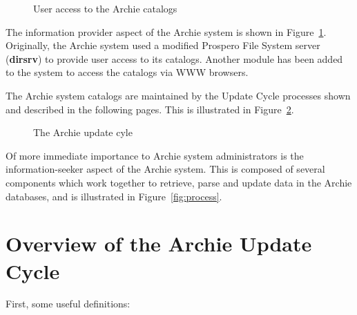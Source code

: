 \begin{figure}[!htb]
\begin{center}
\end{center}
\caption{User access to the Archie catalogs}
\label{fig:catalogs}
\end{figure}

The information provider aspect of the Archie system is shown in Figure~\ref{fig:catalogs}.
Originally, the Archie system used a modified Prospero File System server
({\bf dirsrv}) to provide user access to its catalogs.  Another module
has been added to the system to access the catalogs via WWW
browsers. \new


The Archie system catalogs are maintained by the Update Cycle processes shown
and described in the following pages. This is illustrated in Figure~\ref{fig:cycle}.


\begin{figure}[!htb]
\begin{center}
\end{center}
\caption{The Archie update cyle}
\label{fig:cycle}
\end{figure}

Of more immediate importance to Archie system administrators is the
information-seeker aspect of the Archie system. This is composed of several
components which work together to retrieve, parse and update data in the
Archie databases, and is illustrated in Figure~\ref{fig:process}.


\section{Overview of the Archie Update Cycle}

First, some useful definitions:

